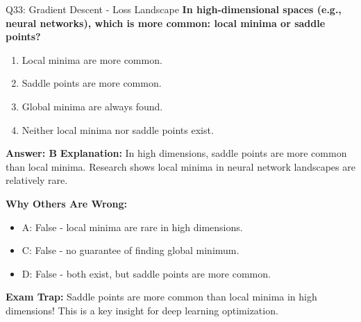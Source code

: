 \documentclass[8pt]{beamer}
\begin{document}
	\begin{frame}{Q33: Gradient Descent - Loss Landscape}
		\fontsize{6.5}{7.5}\selectfont
		\textbf{In high-dimensional spaces (e.g., neural networks), which is more common: local minima or saddle points?}
		
		\begin{enumerate}
			\item Local minima are more common.
			\item Saddle points are more common.
			\item Global minima are always found.
			\item Neither local minima nor saddle points exist.
		\end{enumerate}
		
		\vspace{0.05cm}
		\textcolor{myblue}{\textbf{Answer: B}}
		\vspace{0.05cm}
		\textcolor{myblue}{\textbf{Explanation:}} In high dimensions, saddle points are more common than local minima. Research shows local minima in neural network landscapes are relatively rare.
		
		\vspace{0.05cm}
		\textcolor{myred}{\textbf{Why Others Are Wrong:}}
		\begin{itemize}
			\item \textcolor{myred}{A:} False - local minima are rare in high dimensions.
			\item \textcolor{myred}{C:} False - no guarantee of finding global minimum.
			\item \textcolor{myred}{D:} False - both exist, but saddle points are more common.
		\end{itemize}
		
		\textcolor{myred}{\textbf{Exam Trap:}} Saddle points are \textcolor{myblue}{more common} than local minima in high dimensions! This is a key insight for deep learning optimization.
	\end{frame}
	
\end{document}
